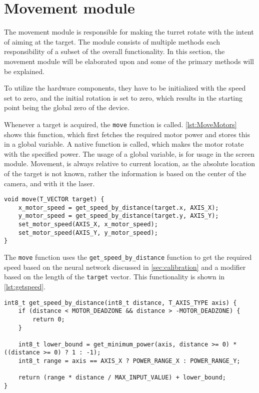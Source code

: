 \section{Movement module}
\label{sec:movement}
The movement module is responsible for making the turret rotate with the intent of aiming at the target.
The module consists of multiple methods each responsibility of a subset of the overall functionality.
In this section, the movement module will be elaborated upon and some of the primary methods will be explained.

To utilize the hardware components, they have to be initialized with the speed set to zero, and the initial rotation is set to zero, which results in the starting point being the global zero of the device.

Whenever a target is acquired, the \texttt{move} function is called.
\autoref{lst:MoveMotors} shows this function, which first fetches the required motor power and stores this in a global variable.
A native function is called, which makes the motor rotate with the specified power.
The usage of a global variable, is for usage in the screen module.
Movement, is always relative to current location, as the absolute location of the target is not known, rather the information is based on the center of the camera, and with it the laser.

\begin{lstlisting}[language=CSharp,caption={move method from movement.c},label={lst:MoveMotors}]
void move(T_VECTOR target) {
    x_motor_speed = get_speed_by_distance(target.x, AXIS_X);
    y_motor_speed = get_speed_by_distance(target.y, AXIS_Y);
    set_motor_speed(AXIS_X, x_motor_speed);
    set_motor_speed(AXIS_Y, y_motor_speed);
}
\end{lstlisting}


The \texttt{move} function uses the \texttt{get\_speed\_by\_distance} function to get the required speed based on the neural network discussed in \autoref{sec:calibration} and a modifier based on the length of the \texttt{target} vector.
This functionality is shown in \autoref{lst:getspeed}.

\begin{lstlisting}[language=CSharp,caption={get\_speed\_by\_distance method from movement.c},label={lst:getspeed},firstnumber={109}]
int8_t get_speed_by_distance(int8_t distance, T_AXIS_TYPE axis) {
    if (distance < MOTOR_DEADZONE && distance > -MOTOR_DEADZONE) {
        return 0;
    }

    int8_t lower_bound = get_minimum_power(axis, distance >= 0) * ((distance >= 0) ? 1 : -1);
    int8_t range = axis == AXIS_X ? POWER_RANGE_X : POWER_RANGE_Y;

    return (range * distance / MAX_INPUT_VALUE) + lower_bound;
}
\end{lstlisting}

